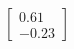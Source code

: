 \documentclass[preview]{standalone}
\begin{document}
\begin{align*}
\begin{bmatrix} 0.61 \\ -0.23 \end{bmatrix}
\end{align*}
\end{document}
